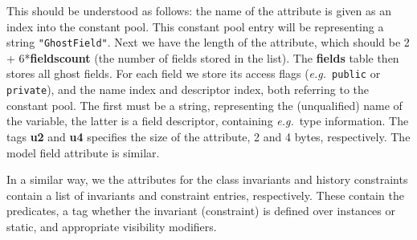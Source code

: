 This should be understood as follows: the name of the attribute is
given as an index into the constant pool. This constant pool entry
will be representing a string \texttt{"Ghost\unsc Field"}. Next we
have the length of the attribute, which should be 2 +
6*\textbf{fields\unsc count} (the number of fields stored in the
list). The \textbf{fields} table then stores all ghost fields. For
each field we store its access flags (\emph{e.g.}\ \texttt{public} or
\texttt{private}), and the name index and descriptor index, both
referring to the constant pool. The first must be a string,
representing the (unqualified) name of the variable, the latter is a
field descriptor, containing \emph{e.g.}\ type information.  The tags
\textbf{u2} and \textbf{u4} specifies the size of the attribute, 2 and
4 bytes, respectively. The model field attribute is similar.

In a similar way, we the attributes for 
the class invariants and history constraints contain a list of
invariants and constraint entries, respectively. These contain the
predicates, a tag whether the invariant (constraint) is defined over
instances or static, and appropriate visibility modifiers.



